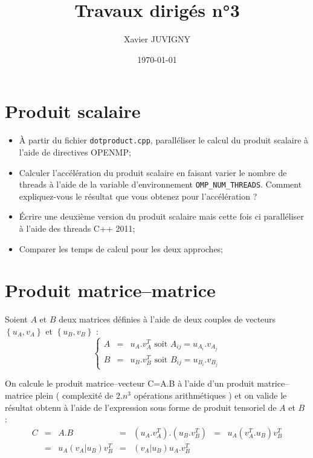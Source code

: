 \documentclass[11pt,a4paper]{article}
\author{Xavier JUVIGNY}
\date{\today}
\title{Travaux dirigés n°3}
\begin{document}
\maketitle
\tableofcontents

\section{Produit scalaire}

\begin{itemize}
\item \`A partir du fichier \texttt{dotproduct.cpp}, paralléliser le calcul du produit scalaire à l'aide de directives OPENMP;
\item Calculer l'accélération du produit scalaire en faisant varier le nombre de threads à l'aide de la variable d'environnement
\texttt{OMP\_NUM\_THREADS}. Comment expliquez-vous le résultat que vous obtenez pour l'accélération ?
\item \'Ecrire une deuxième version du produit scalaire mais cette fois ci paralléliser à l'aide des threads C++ 2011;
\item Comparer les temps de calcul pour les deux approches;
\end{itemize}

\section{Produit matrice--matrice}

Soient $A$ et $B$ deux matrices définies à l'aide de deux couples de vecteurs $\left\{u_{A},v_{A}\right\}$ et 
$\left\{u_{B},v_{B}\right\}$ :
\[
\left\{
	\begin{array}{lcl}
	A & = & u_{A}.v_{A}^{T}\mbox{ soit } A_{ij} = u_{A_{i}}.v_{A_{j}} \\
	B & = & u_{B}.v_{B}^{T}\mbox{ soit } B_{ij} = u_{B_{i}}.v_{B_{j}}
    \end{array}
\right.
\]

On calcule le produit matrice--vecteur C=A.B à l'aide d'un produit matrice--matrice plein ( complexité de $2.n^{3}$ opérations arithmétiques )
et on valide le résultat obtenu à l'aide de l'expression sous forme de produit tensoriel de $A$ et $B$ :
\[
\begin{array}{lclclcl}
C & = & A.B & = & \left(u_{A}.v_{A}^{T}\right).\left(u_{B}.v_{B}^{T}\right) & = &  u_{A}\left(v_{A}^{T}.u_{B}\right)v_{B}^{T}\\
 &=& u_{A}\left(v_{A}|u_{B}\right)v_{B}^{T} & = & \left(v_{A}|u_{B}\right)u_{A}.v_{B}^{T}
 \end{array}
\]
\end{document}
